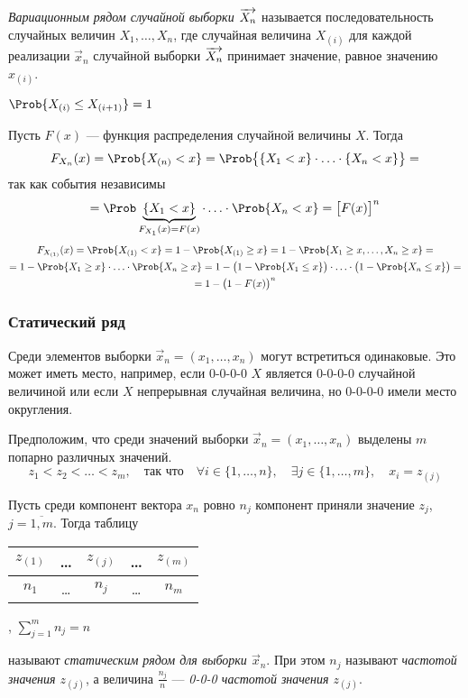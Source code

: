 \begin{defn}
	\emph{Вариационным рядом случайной выборки $\overrightarrow{X_n}$} называется последовательность случайных величин $X_{1}, \dots, X_{n}$, где случайная величина $X_{(i)}$ для каждой реализации $\vec{x}_n$ случайной выборки $\overrightarrow{X_n}$ принимает значение, равное значению $x_{(i)}$.
\end{defn}
\begin{rem}
	$\Prob \{ X_{(i)} \leq X_{(i+1)} \} = 1$
\end{rem}
\begin{rem}
	Пусть $F(x)$ --- функция распределения случайной величины $X$. Тогда
	\[
		F_{X_n}(x) = \Prob \{ X_{(n)} < x \} = \Prob \bigl\{ \{ X_1 < x \} \cdot \ldots \cdot \{ X_n < x \} \bigr\} =
	\]
	так как события независимы
	\[
		= \Prob \underbrace{\{ X_1 < x \}}_{F_{X_1}(x) = F(x)} \cdot \ldots \cdot \Prob \{ X_n < x \} = \bigl[ F(x) \bigr]^n
	\]
	\begin{multline*}
		F_{X_{(1)}}(x) = \Prob \{ X_{(1)} < x \} = 1 - \Prob \{ X_{(1)} \geq x \} = 1 - \Prob \{ X_1 \geq x, \ldots, X_n \geq x \} = \\
		= 1 - \Prob \{ X_1 \geq x \} \cdot \ldots \cdot \Prob \{ X_n \geq x \} = 1 - \bigl(1 - \Prob \{ X_1 \leq x \}\bigr) \cdot \ldots \cdot \bigl(1 - \Prob \{ X_n \leq x \}\bigr) = \\
		= 1 - \bigl(1 - F(x)\bigr)^n
	\end{multline*}
\end{rem}


\subsubsection{Статический ряд}

Среди элементов выборки $\vec{x}_n = (x_1, \ldots, x_n)$ могут встретиться одинаковые. Это может иметь место, например, если 0-0-0-0 $X$ является 0-0-0-0 случайной величиной или если $X$ непрерывная случайная величина, но 0-0-0-0 имели место округления.

Предположим, что среди значений выборки $\vec{x}_n = (x_1, \ldots, x_n)$ выделены $m$ попарно различных значений. 
\[
	z_{1} < z_{2} < \ldots < z_{m}, \quad \text{так что} \quad \forall i \in \{ 1, \ldots, n \}, \quad \exists j \in \{ 1, \ldots, m \}, \quad x_i = z_{(j)}
\]

Пусть среди компонент вектора $x_n$ ровно $n_j$ компонент приняли значение $z_j$, $j = \overline{1, m}$. Тогда таблицу
\begin{center} \begin{tabular}{| c | c | c | c | c |}
		\hline
		$z_{(1)}$ & \ldots & $z_{(j)}$ & \ldots & $z_{(m)}$ \\
		\hline
		$n_1$ & \ldots & $n_j$ & \ldots & $n_m$ \\
		\hline
\end{tabular} ,
\qquad $\sum_{j = 1}^{m} n_j = n$ \end{center}
называют \emph{статическим рядом для выборки $\vec{x}_n$}. При этом $n_j$ называют \emph{частотой значения $z_{(j)}$}, а величина $\frac{n_j}{n}$ --- \emph{0-0-0 частотой значения $z_{(j)}$}.


